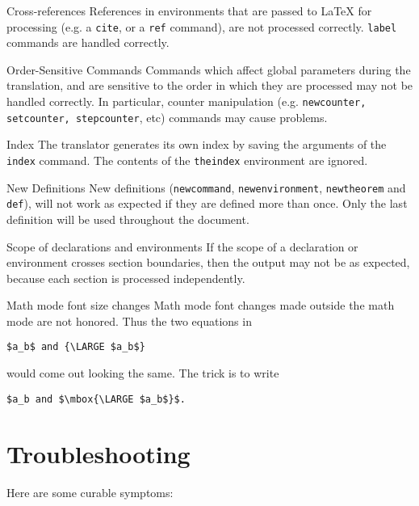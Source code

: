 \begin{htmllist}
\item [Cross-references\index{cross-references}]
References in environments that are passed to LaTeX  for processing
(e.g. a \texttt{cite}, or a \texttt{ref} command), are not processed
correctly.
\texttt{label} commands are handled correctly.

\item[Order-Sensitive Commands]
Commands which affect global parameters during the translation,
and are sensitive to the order in which they are processed may
not be handled correctly. In particular, counter manipulation
(e.g. \texttt{newcounter, setcounter, stepcounter}, etc) 
commands may cause problems.

\item [Index\index{index}]
The translator generates its own index by saving the arguments  of 
the \texttt{index} command. The contents of the \texttt{theindex}
environment are ignored.

\item[New Definitions\index{new definitions}]
New definitions (\texttt{newcommand}, \texttt{newenvironment}, 
\texttt{newtheorem} and \texttt{def}),
will not work as expected if they are defined more than once.
Only the last definition will be used throughout the document.

\item [Scope of declarations and environments]
If the scope of a declaration or environment crosses section
boundaries, then the output may not be as expected, because each
section is processed independently.

\item [Math mode font size changes]  Math mode font changes
made outside the math mode are not honored.  Thus the two equations
in
\begin{verbatim}
$a_b$ and {\LARGE $a_b$}
\end{verbatim}
would come out looking the same.  The trick is to write
\begin{verbatim}
$a_b and $\mbox{\LARGE $a_b$}$.
\end{verbatim}

\end{htmllist}
\section{Troubleshooting}
  
Here are some curable symptoms:

